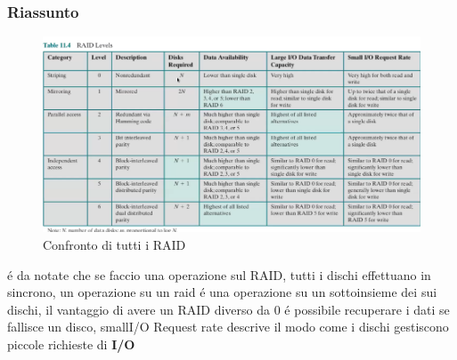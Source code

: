 \subsubsection*{Riassunto}
\begin{figure}[H]
    \centering
    \includegraphics[width=1\textwidth]{immagini/Confronto RAID}
    \caption{Confronto di tutti i RAID}
\end{figure}
é da notate che se faccio una operazione sul RAID, tutti i dischi effettuano in sincrono, un operazione
su un raid é una operazione su un sottoinsieme dei sui dischi, il vantaggio di avere un RAID diverso da 0 é possibile
recuperare i dati se fallisce un disco, smallI/O Request rate descrive il modo come i dischi gestiscono piccole richieste
di \textbf{I/O}
